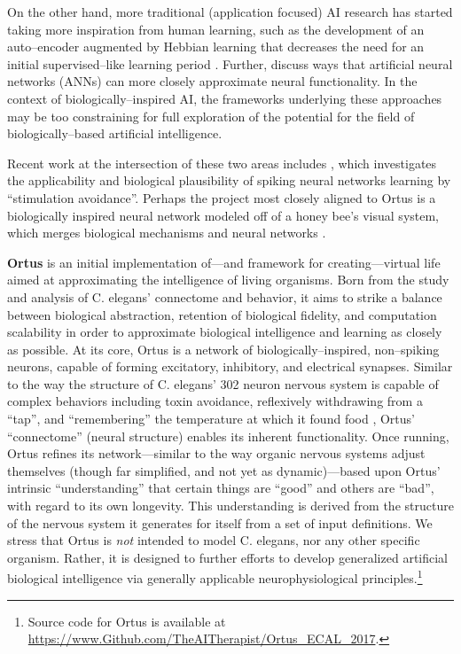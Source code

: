 \documentclass[letterpaper]{article}
\begin{document}
On the other hand, more traditional (application focused) AI research has started taking more inspiration from human learning, such as the development of an auto--encoder augmented by Hebbian learning that decreases the need for an initial supervised--like learning period \citep{Bowren2016}. Further, \citet{Marblestone2016} discuss ways that artificial neural networks (ANNs) can more closely approximate neural functionality.
In the context of biologically--inspired AI, the frameworks underlying these approaches may be too constraining for full exploration of the potential for the field of biologically--based artificial intelligence. 

Recent work at the intersection of these two areas includes \citet{Sinapayen2016}, which investigates the applicability and biological plausibility of spiking neural networks learning by ``stimulation avoidance''. Perhaps the project most closely aligned to Ortus is a biologically inspired neural network modeled off of a honey bee's visual system, which merges biological mechanisms and neural networks \citep{Roper2017}.

\vspace{.1in}
\textbf{Ortus} is an initial implementation of---and framework for creating---virtual life aimed at approximating the intelligence of living organisms.
Born from the study and analysis of C. elegans' connectome and behavior, it aims to strike a balance between biological abstraction, retention of biological fidelity, and computation scalability in order to approximate biological intelligence and learning as closely as possible.
At its core, Ortus is a network of biologically--inspired, non--spiking neurons, capable of forming excitatory, inhibitory, and electrical synapses.
Similar to the way the structure of C. elegans' 302 neuron nervous system is capable of complex behaviors including toxin avoidance, reflexively withdrawing from a ``tap'', and ``remembering'' the temperature at which it found food \citep{Jarrell2012}, Ortus' ``connectome'' (neural structure) enables its inherent functionality.
Once running, Ortus refines its network---similar to the way organic nervous systems adjust themselves (though far simplified, and not yet as dynamic)---based upon Ortus' intrinsic ``understanding'' that certain things are ``good'' and others are ``bad'', with regard to its own longevity.
This understanding is derived from the structure of the nervous system it generates for itself from a set of input definitions.
We stress that Ortus is \textit{not} intended to model C. elegans, nor any other specific organism. Rather, it is designed to further efforts to develop generalized artificial biological intelligence via generally applicable neurophysiological principles.\footnote{Source code for Ortus is available at \url{https://www.Github.com/TheAITherapist/Ortus_ECAL_2017}.}
\end{document}
